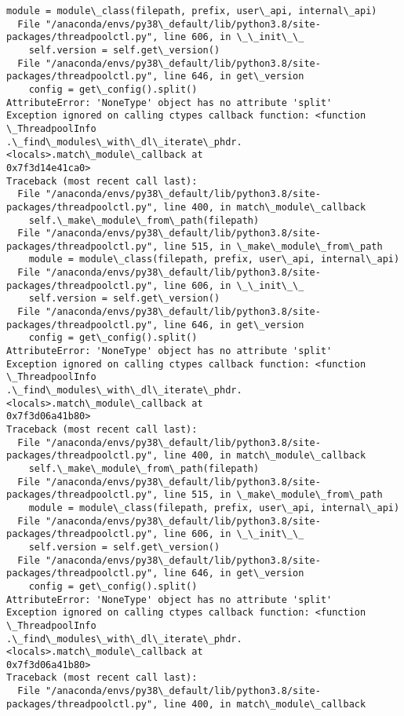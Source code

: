 \documentclass[11pt]{article}
\begin{document}
\begin{Verbatim}[commandchars=\\\{\}]
    module = module\_class(filepath, prefix, user\_api, internal\_api)
  File "/anaconda/envs/py38\_default/lib/python3.8/site-
packages/threadpoolctl.py", line 606, in \_\_init\_\_
    self.version = self.get\_version()
  File "/anaconda/envs/py38\_default/lib/python3.8/site-
packages/threadpoolctl.py", line 646, in get\_version
    config = get\_config().split()
AttributeError: 'NoneType' object has no attribute 'split'
Exception ignored on calling ctypes callback function: <function \_ThreadpoolInfo
.\_find\_modules\_with\_dl\_iterate\_phdr.<locals>.match\_module\_callback at
0x7f3d14e41ca0>
Traceback (most recent call last):
  File "/anaconda/envs/py38\_default/lib/python3.8/site-
packages/threadpoolctl.py", line 400, in match\_module\_callback
    self.\_make\_module\_from\_path(filepath)
  File "/anaconda/envs/py38\_default/lib/python3.8/site-
packages/threadpoolctl.py", line 515, in \_make\_module\_from\_path
    module = module\_class(filepath, prefix, user\_api, internal\_api)
  File "/anaconda/envs/py38\_default/lib/python3.8/site-
packages/threadpoolctl.py", line 606, in \_\_init\_\_
    self.version = self.get\_version()
  File "/anaconda/envs/py38\_default/lib/python3.8/site-
packages/threadpoolctl.py", line 646, in get\_version
    config = get\_config().split()
AttributeError: 'NoneType' object has no attribute 'split'
Exception ignored on calling ctypes callback function: <function \_ThreadpoolInfo
.\_find\_modules\_with\_dl\_iterate\_phdr.<locals>.match\_module\_callback at
0x7f3d06a41b80>
Traceback (most recent call last):
  File "/anaconda/envs/py38\_default/lib/python3.8/site-
packages/threadpoolctl.py", line 400, in match\_module\_callback
    self.\_make\_module\_from\_path(filepath)
  File "/anaconda/envs/py38\_default/lib/python3.8/site-
packages/threadpoolctl.py", line 515, in \_make\_module\_from\_path
    module = module\_class(filepath, prefix, user\_api, internal\_api)
  File "/anaconda/envs/py38\_default/lib/python3.8/site-
packages/threadpoolctl.py", line 606, in \_\_init\_\_
    self.version = self.get\_version()
  File "/anaconda/envs/py38\_default/lib/python3.8/site-
packages/threadpoolctl.py", line 646, in get\_version
    config = get\_config().split()
AttributeError: 'NoneType' object has no attribute 'split'
Exception ignored on calling ctypes callback function: <function \_ThreadpoolInfo
.\_find\_modules\_with\_dl\_iterate\_phdr.<locals>.match\_module\_callback at
0x7f3d06a41b80>
Traceback (most recent call last):
  File "/anaconda/envs/py38\_default/lib/python3.8/site-
packages/threadpoolctl.py", line 400, in match\_module\_callback

\end{Verbatim}
\end{document}
